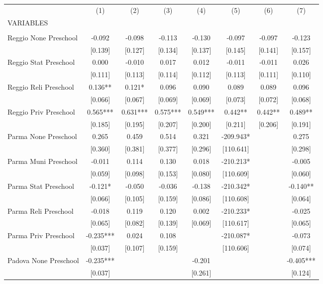 \begin{tabular}{lccccccc} \hline
 & (1) & (2) & (3) & (4) & (5) & (6) & (7) \\
VARIABLES &  &  &  &  &  &  &  \\ \hline
 &  &  &  &  &  &  &  \\
Reggio None Preschool & -0.092 & -0.098 & -0.113 & -0.130 & -0.097 & -0.097 & -0.123 \\
 & [0.139] & [0.127] & [0.134] & [0.137] & [0.145] & [0.141] & [0.157] \\
Reggio Stat Preschool & 0.000 & -0.010 & 0.017 & 0.012 & -0.011 & -0.011 & 0.026 \\
 & [0.111] & [0.113] & [0.114] & [0.112] & [0.113] & [0.111] & [0.110] \\
Reggio Reli Preschool & 0.136** & 0.121* & 0.096 & 0.090 & 0.089 & 0.089 & 0.096 \\
 & [0.066] & [0.067] & [0.069] & [0.069] & [0.073] & [0.072] & [0.068] \\
Reggio Priv Preschool & 0.565*** & 0.631*** & 0.575*** & 0.549*** & 0.442** & 0.442** & 0.489** \\
 & [0.185] & [0.195] & [0.207] & [0.200] & [0.211] & [0.206] & [0.191] \\
Parma None Preschool & 0.265 & 0.459 & 0.514 & 0.321 & -209.943* &  & 0.275 \\
 & [0.360] & [0.381] & [0.377] & [0.296] & [110.641] &  & [0.298] \\
Parma Muni Preschool & -0.011 & 0.114 & 0.130 & 0.018 & -210.213* &  & -0.005 \\
 & [0.059] & [0.098] & [0.153] & [0.080] & [110.609] &  & [0.060] \\
Parma Stat Preschool & -0.121* & -0.050 & -0.036 & -0.138 & -210.342* &  & -0.140** \\
 & [0.066] & [0.105] & [0.159] & [0.086] & [110.608] &  & [0.064] \\
Parma Reli Preschool & -0.018 & 0.119 & 0.120 & 0.002 & -210.233* &  & -0.025 \\
 & [0.065] & [0.082] & [0.139] & [0.069] & [110.617] &  & [0.065] \\
Parma Priv Preschool & -0.235*** & 0.024 & 0.108 &  & -210.087* &  & -0.073 \\
 & [0.037] & [0.107] & [0.159] &  & [110.606] &  & [0.074] \\
Padova None Preschool & -0.235*** &  &  & -0.201 &  &  & -0.405*** \\
 & [0.037] &  &  & [0.261] &  &  & [0.124] \\

\end{tabular}
